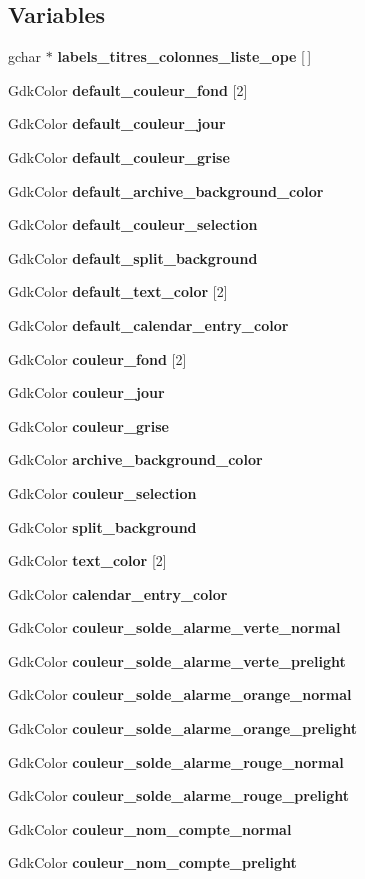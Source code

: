 \subsection*{Variables}
\begin{DoxyCompactItemize}
\item 
gchar $\ast$ {\bf labels\_\-titres\_\-colonnes\_\-liste\_\-ope} [$\,$]
\item 
GdkColor {\bf default\_\-couleur\_\-fond} [2]
\item 
GdkColor {\bf default\_\-couleur\_\-jour}
\item 
GdkColor {\bf default\_\-couleur\_\-grise}
\item 
GdkColor {\bf default\_\-archive\_\-background\_\-color}
\item 
GdkColor {\bf default\_\-couleur\_\-selection}
\item 
GdkColor {\bf default\_\-split\_\-background}
\item 
GdkColor {\bf default\_\-text\_\-color} [2]
\item 
GdkColor {\bf default\_\-calendar\_\-entry\_\-color}
\item 
GdkColor {\bf couleur\_\-fond} [2]
\item 
GdkColor {\bf couleur\_\-jour}
\item 
GdkColor {\bf couleur\_\-grise}
\item 
GdkColor {\bf archive\_\-background\_\-color}
\item 
GdkColor {\bf couleur\_\-selection}
\item 
GdkColor {\bf split\_\-background}
\item 
GdkColor {\bf text\_\-color} [2]
\item 
GdkColor {\bf calendar\_\-entry\_\-color}
\item 
GdkColor {\bf couleur\_\-solde\_\-alarme\_\-verte\_\-normal}
\item 
GdkColor {\bf couleur\_\-solde\_\-alarme\_\-verte\_\-prelight}
\item 
GdkColor {\bf couleur\_\-solde\_\-alarme\_\-orange\_\-normal}
\item 
GdkColor {\bf couleur\_\-solde\_\-alarme\_\-orange\_\-prelight}
\item 
GdkColor {\bf couleur\_\-solde\_\-alarme\_\-rouge\_\-normal}
\item 
GdkColor {\bf couleur\_\-solde\_\-alarme\_\-rouge\_\-prelight}
\item 
GdkColor {\bf couleur\_\-nom\_\-compte\_\-normal}
\item 
GdkColor {\bf couleur\_\-nom\_\-compte\_\-prelight}

\end{DoxyCompactItemize}
